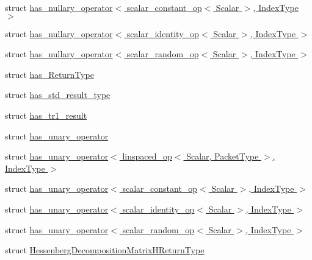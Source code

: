 \begin{DoxyCompactItemize}
\item 
struct \hyperlink{struct_eigen_1_1internal_1_1has__nullary__operator_3_01scalar__constant__op_3_01_scalar_01_4_00_01_index_type_01_4}{has\+\_\+nullary\+\_\+operator$<$ scalar\+\_\+constant\+\_\+op$<$ Scalar $>$, Index\+Type $>$}
\item 
struct \hyperlink{struct_eigen_1_1internal_1_1has__nullary__operator_3_01scalar__identity__op_3_01_scalar_01_4_00_01_index_type_01_4}{has\+\_\+nullary\+\_\+operator$<$ scalar\+\_\+identity\+\_\+op$<$ Scalar $>$, Index\+Type $>$}
\item 
struct \hyperlink{struct_eigen_1_1internal_1_1has__nullary__operator_3_01scalar__random__op_3_01_scalar_01_4_00_01_index_type_01_4}{has\+\_\+nullary\+\_\+operator$<$ scalar\+\_\+random\+\_\+op$<$ Scalar $>$, Index\+Type $>$}
\item 
struct \hyperlink{struct_eigen_1_1internal_1_1has___return_type}{has\+\_\+\+Return\+Type}
\item 
struct \hyperlink{struct_eigen_1_1internal_1_1has__std__result__type}{has\+\_\+std\+\_\+result\+\_\+type}
\item 
struct \hyperlink{struct_eigen_1_1internal_1_1has__tr1__result}{has\+\_\+tr1\+\_\+result}
\item 
struct \hyperlink{struct_eigen_1_1internal_1_1has__unary__operator}{has\+\_\+unary\+\_\+operator}
\item 
struct \hyperlink{struct_eigen_1_1internal_1_1has__unary__operator_3_01linspaced__op_3_01_scalar_00_01_packet_type_01_4_00_01_index_type_01_4}{has\+\_\+unary\+\_\+operator$<$ linspaced\+\_\+op$<$ Scalar, Packet\+Type $>$, Index\+Type $>$}
\item 
struct \hyperlink{struct_eigen_1_1internal_1_1has__unary__operator_3_01scalar__constant__op_3_01_scalar_01_4_00_01_index_type_01_4}{has\+\_\+unary\+\_\+operator$<$ scalar\+\_\+constant\+\_\+op$<$ Scalar $>$, Index\+Type $>$}
\item 
struct \hyperlink{struct_eigen_1_1internal_1_1has__unary__operator_3_01scalar__identity__op_3_01_scalar_01_4_00_01_index_type_01_4}{has\+\_\+unary\+\_\+operator$<$ scalar\+\_\+identity\+\_\+op$<$ Scalar $>$, Index\+Type $>$}
\item 
struct \hyperlink{struct_eigen_1_1internal_1_1has__unary__operator_3_01scalar__random__op_3_01_scalar_01_4_00_01_index_type_01_4}{has\+\_\+unary\+\_\+operator$<$ scalar\+\_\+random\+\_\+op$<$ Scalar $>$, Index\+Type $>$}
\item 
struct \hyperlink{group___eigenvalues___module_struct_eigen_1_1internal_1_1_hessenberg_decomposition_matrix_h_return_type}{Hessenberg\+Decomposition\+Matrix\+H\+Return\+Type}

\end{DoxyCompactItemize}
